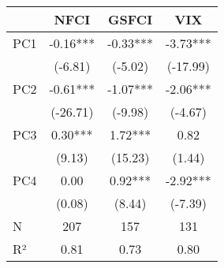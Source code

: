 \begingroup
\fontsize{12.0pt}{14.4pt}\selectfont
\begin{tabular}{lccc}
\toprule
  & NFCI & GSFCI & VIX \\ 
\midrule\addlinespace[2.5pt]
PC1 & -0.16*** & -0.33*** & -3.73*** \\ 
 & (-6.81) & (-5.02) & (-17.99) \\ 
PC2 & -0.61*** & -1.07*** & -2.06*** \\ 
 & (-26.71) & (-9.98) & (-4.67) \\ 
PC3 & 0.30*** & 1.72*** & 0.82 \\ 
 & (9.13) & (15.23) & (1.44) \\ 
PC4 & 0.00 & 0.92*** & -2.92*** \\ 
{} & {(0.08)} & {(8.44)} & {(-7.39)} \\ 
\midrule\addlinespace[2.5pt]
  N & 207 & 157 & 131 \\ 
R² & 0.81 & 0.73 & 0.80 \\ 
\bottomrule
\end{tabular}
\endgroup

